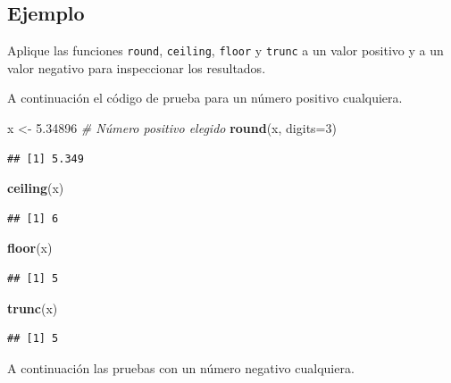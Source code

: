 \documentclass[10pt,]{krantz}
\makeatletter
\newenvironment{Shaded}{\begin{snugshade}}{\end{snugshade}}
\newcommand{\KeywordTok}[1]{\textcolor[rgb]{0.13,0.29,0.53}{\textbf{{#1}}}}
\newcommand{\DataTypeTok}[1]{\textcolor[rgb]{0.13,0.29,0.53}{{#1}}}
\newcommand{\DecValTok}[1]{\textcolor[rgb]{0.00,0.00,0.81}{{#1}}}
\newcommand{\FloatTok}[1]{\textcolor[rgb]{0.00,0.00,0.81}{{#1}}}
\newcommand{\StringTok}[1]{\textcolor[rgb]{0.31,0.60,0.02}{{#1}}}
\newcommand{\CommentTok}[1]{\textcolor[rgb]{0.56,0.35,0.01}{\textit{{#1}}}}
\newcommand{\NormalTok}[1]{{#1}}
\newenvironment{kframe}{%
\medskip{}
\setlength{\fboxsep}{.8em}
 \def\at@end@of@kframe{}%
 \ifinner\ifhmode%
  \def\at@end@of@kframe{\end{minipage}}%
  \begin{minipage}{\columnwidth}%
 \fi\fi%
 \def\FrameCommand##1{\hskip\@totalleftmargin \hskip-\fboxsep
 \colorbox{shadecolor}{##1}\hskip-\fboxsep
     \hskip-\linewidth \hskip-\@totalleftmargin \hskip\columnwidth}%
 \MakeFramed {\advance\hsize-\width
   \@totalleftmargin\z@ \linewidth\hsize
   \@setminipage}}%
 {\par\unskip\endMakeFramed%
 \at@end@of@kframe}
\renewenvironment{Shaded}{\begin{kframe}}{\end{kframe}}
\makeatother
\begin{document}
\subsection*{Ejemplo}\label{ejemplo-6}


Aplique las funciones \texttt{round}, \texttt{ceiling}, \texttt{floor} y
\texttt{trunc} a un valor positivo y a un valor negativo para
inspeccionar los resultados.

A continuación el código de prueba para un número positivo cualquiera.

\begin{Shaded}
\begin{Highlighting}[]
\NormalTok{x <-}\StringTok{ }\FloatTok{5.34896}  \CommentTok{# Número positivo elegido}
\KeywordTok{round}\NormalTok{(x, }\DataTypeTok{digits=}\DecValTok{3}\NormalTok{)}
\end{Highlighting}
\end{Shaded}

\begin{verbatim}
## [1] 5.349
\end{verbatim}

\begin{Shaded}
\begin{Highlighting}[]
\KeywordTok{ceiling}\NormalTok{(x)}
\end{Highlighting}
\end{Shaded}

\begin{verbatim}
## [1] 6
\end{verbatim}

\begin{Shaded}
\begin{Highlighting}[]
\KeywordTok{floor}\NormalTok{(x)}
\end{Highlighting}
\end{Shaded}

\begin{verbatim}
## [1] 5
\end{verbatim}

\begin{Shaded}
\begin{Highlighting}[]
\KeywordTok{trunc}\NormalTok{(x)}
\end{Highlighting}
\end{Shaded}

\begin{verbatim}
## [1] 5
\end{verbatim}

A continuación las pruebas con un número negativo cualquiera.
\end{document}
